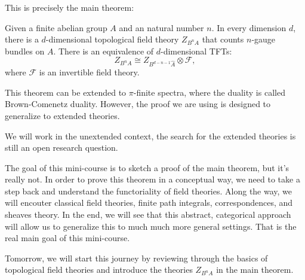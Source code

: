 \documentclass[./main]{subfiles}
\begin{document}
This is precisely the main theorem:

\begin{theorem}
    Given a finite abelian group $A$ and an natural number $n$. In every dimension $d$,
    there is a $d$-dimensional topological field theory $Z_{B^nA}$ that counts $n$-gauge bundles on $A$.
    There is an equivalence of $d$-dimensional TFTs:
    \begin{equation}
        Z_{B^nA} \cong Z_{B^{d-n-1}\hat{A}} \otimes \mathcal{F},
    \end{equation}
    where $\mathcal{F}$ is an invertible field theory.
\end{theorem}

\begin{remark}
    This theorem can be extended to $\pi$-finite spectra, where the duality is called Brown-Comenetz duality.
    However, the proof we are using is designed to generalize to extended theories.
\end{remark}

\begin{remark}
    We will work in the unextended context, the search for the extended theories is still an open 
    research question. 
\end{remark}

The goal of this mini-course is to sketch a proof of the main theorem, but it's really not.
In order to prove this theorem in a conceptual way, we need to take a step back and 
understand the functoriality of field theories. Along the way,
we will encouter classical field theories, finite path integrals, correspondences, and sheaves theory.
In the end, we will see that this abstract, categorical approach will allow us to generalize
this to much much more general settings. That is the real main goal of this mini-course.

Tomorrow, we will start this journey by reviewing through the basics of topological field theories
and introduce the theories $Z_{B^nA}$ in the main theorem.
\end{document}
